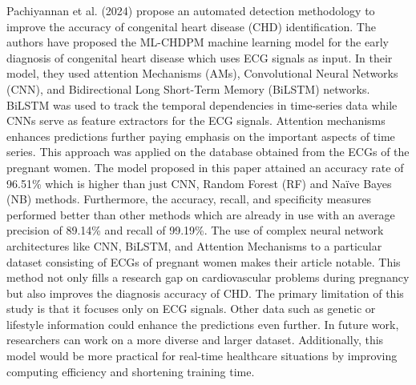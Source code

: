 Pachiyannan et al.\cite{technologies12010004} (2024) propose an automated detection methodology to improve the accuracy of congenital heart disease (CHD) identification. The authors have proposed the ML-CHDPM machine learning model for the early diagnosis of congenital heart disease which uses ECG signals as input. In their model, they used attention Mechanisms (AMs), Convolutional Neural Networks (CNN), and Bidirectional Long Short-Term Memory (BiLSTM) networks. BiLSTM was used to track the temporal dependencies in time-series data while CNNs serve as feature extractors for the ECG signals. Attention mechanisms enhances predictions further paying emphasis on the important aspects of time series. This approach was applied on the database obtained from the ECGs of the pregnant women. The model proposed in this paper attained an accuracy rate of 96.51\% which is higher than just CNN, Random Forest (RF) and Naïve Bayes (NB) methods. Furthermore, the accuracy, recall, and specificity measures performed better than other methods which are already in use with an average precision of 89.14\% and recall of 99.19\%. The use of complex neural network architectures like CNN, BiLSTM, and Attention Mechanisms to a particular dataset consisting of ECGs of pregnant women makes their article notable. This method not only fills a research gap on cardiovascular problems during pregnancy but also improves the diagnosis accuracy of CHD. The primary limitation of this study is that it focuses only on ECG signals. Other data such as genetic or lifestyle information could enhance the predictions even further. In future work, researchers can work on a more diverse and larger dataset. Additionally, this model would be more practical for real-time healthcare situations by improving computing efficiency and shortening training time.
\vspace{0.5cm}


